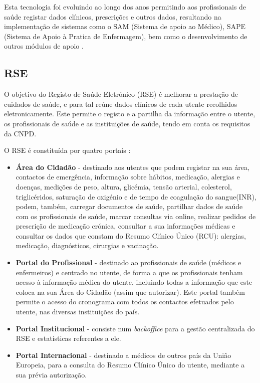 \documentclass[conference]{IEEEtran}
\begin{document}
Esta tecnologia foi evoluindo ao longo dos anos permitindo aos profissionais de saúde registar dados clínicos, prescrições e outros dados, resultando na implementação de sistemas como o SAM (Sistema de apoio ao Médico), SAPE (Sistema de Apoio à Pratica de Enfermagem), bem como o desenvolvimento de outros módulos de apoio \cite{sinus}.


\subsection{RSE}

O objetivo do Registo de Saúde Eletrónico (RSE) é melhorar a prestação de cuidados de saúde, e para tal reúne dados clínicos de cada utente recolhidos eletronicamente. Este permite o registo e a partilha da informação entre o utente, os profissionais de saúde e as instituições de saúde, tendo em conta os requisitos da CNPD.

O RSE é constituída por quatro portais \cite{rse}:

\begin{itemize}

	\item \textbf{Área do Cidadão} - destinado aos utentes que podem registar na sua área, contactos de emergência, informação sobre hábitos, medicação, alergias e doenças, medições de peso, altura, glicémia, tensão arterial, colesterol, triglicéridos, saturação de oxigénio e de tempo de coagulação do sangue(INR), podem, também, carregar documentos de saúde, partilhar dados de saúde com os profissionais de saúde, marcar consultas via online, realizar pedidos de prescrição de medicação crónica, consultar a sua informações médicas e consultar os dados que constam do Resumo Clínico Único (RCU): alergias, medicação, diagnósticos, cirurgias e vacinação.
	
	\item \textbf{Portal do Profissional} - destinado ao profissionais de saúde (médicos e enfermeiros) e centrado no utente, de forma a que os profissionais tenham acesso à informação médica do utente, incluindo todas a informação que este coloca na sua Área do Cidadão (assim que autorizar). Este portal também permite o acesso do cronograma com todos os contactos efetuados pelo utente, nas diversas instituições do país.
	
	\item \textbf{Portal Institucional} - consiste num \textit{backoffice} para a gestão centralizada do RSE e estatísticas referentes a ele.
	
	\item \textbf{Portal Internacional} - destinado a médicos de outros país da União Europeia, para a consulta do Resumo Clínico Único do utente, mediante a sua prévia autorização.

\end{itemize}
\end{document}
